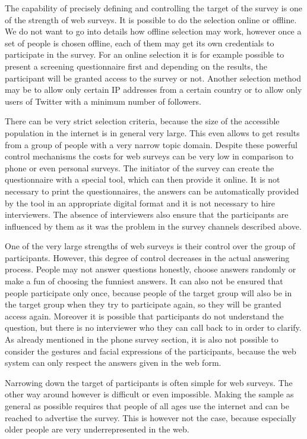 \documentclass{report}
\begin{document}
The capability of precisely defining and controlling the target of the survey is one of the strength of web surveys. It is possible to do the selection online or offline. We do not want to go into details how offline selection may work, however once a set of people is chosen offline, each of them may get its own credentials to participate in the survey. For an online selection it is for example possible to present a screening questionnaire first and depending on the results, the participant will be granted access to the survey or not. Another selection method may be to allow only certain IP addresses from a certain country or to allow only users of Twitter with a minimum number of followers.

There can be very strict selection criteria, because the size of the accessible population in the internet is in general very large. This even allows to get results from a group of people with a very narrow topic domain. Despite these powerful control mechanisms the costs for web surveys can be very low in comparison to phone or even personal surveys. The initiator of the survey can create the questionnaire with a special tool, which can then provide it online. It is not necessary to print the questionnaires, the answers can be automatically provided by the tool in an appropriate digital format and it is not necessary to hire interviewers. The absence of interviewers also ensure that the participants are influenced by them as it was the problem in the survey channels described above.

One of the very large strengths of web surveys is their control over the group of participants. However, this degree of control decreases in the actual answering process. People may not answer questions honestly, choose answers randomly or make a fun of choosing the funniest answers. It can also not be ensured that people participate only once, because people of the target group will also be in the target group when they try to participate again, so they will be granted access again. Moreover it is possible that participants do not understand the question, but there is no interviewer who they can call back to in order to clarify. As already mentioned in the phone survey section, it is also not possible to consider the gestures and facial expressions of the participants, because the web system can only respect the answers given in the web form.

Narrowing down the target of participants is often simple for web surveys. The other way around however is difficult or even impossible. Making the sample as general as possible requires that people of all ages use the internet and can be reached to advertise the survey. This is however not the case, because especially older people are very underrepresented in the web.
\end{document}
